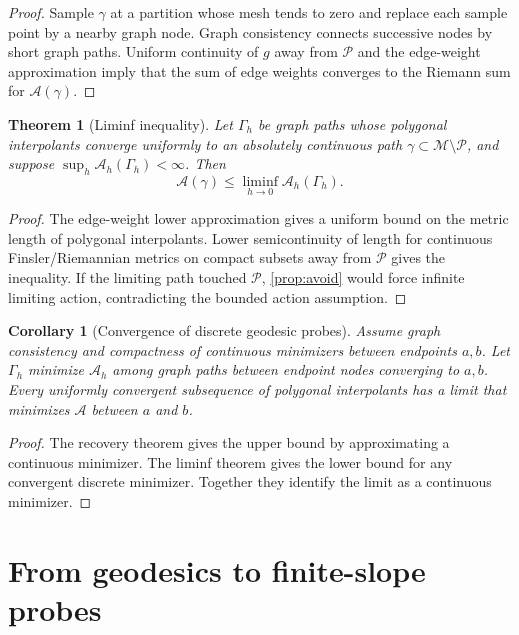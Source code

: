 \documentclass[11pt]{article}
\newtheorem{theorem}[definition]{Theorem}
\newtheorem{corollary}[definition]{Corollary}
\newcommand{\A}{\mathcal A}
\newcommand{\M}{\mathcal M}
\newcommand{\Pset}{\mathcal P}
\begin{document}
\begin{proof}
Sample \(\gamma\) at a partition whose mesh tends to zero and replace each sample point by a nearby graph node. Graph consistency connects successive nodes by short graph paths. Uniform continuity of \(g\) away from \(\Pset\) and the edge-weight approximation imply that the sum of edge weights converges to the Riemann sum for \(\A(\gamma)\).
\end{proof}

\begin{theorem}[Liminf inequality]\label{thm:liminf}
Let \(\Gamma_h\) be graph paths whose polygonal interpolants converge uniformly to an absolutely continuous path \(\gamma\subset\M\setminus\Pset\), and suppose \(\sup_h\A_h(\Gamma_h)<\infty\). Then
\[
        \A(\gamma)\le \liminf_{h\to0}\A_h(\Gamma_h).
\]
\end{theorem}

\begin{proof}
The edge-weight lower approximation gives a uniform bound on the metric length of polygonal interpolants. Lower semicontinuity of length for continuous Finsler/Riemannian metrics on compact subsets away from \(\Pset\) gives the inequality. If the limiting path touched \(\Pset\), \cref{prop:avoid} would force infinite limiting action, contradicting the bounded action assumption.
\end{proof}

\begin{corollary}[Convergence of discrete geodesic probes]\label{cor:minimizers}
Assume graph consistency and compactness of continuous minimizers between endpoints \(a,b\). Let \(\Gamma_h\) minimize \(\A_h\) among graph paths between endpoint nodes converging to \(a,b\). Every uniformly convergent subsequence of polygonal interpolants has a limit that minimizes \(\A\) between \(a\) and \(b\).
\end{corollary}

\begin{proof}
The recovery theorem gives the upper bound by approximating a continuous minimizer. The liminf theorem gives the lower bound for any convergent discrete minimizer. Together they identify the limit as a continuous minimizer.
\end{proof}

\section{From geodesics to finite-slope probes}
\end{document}
